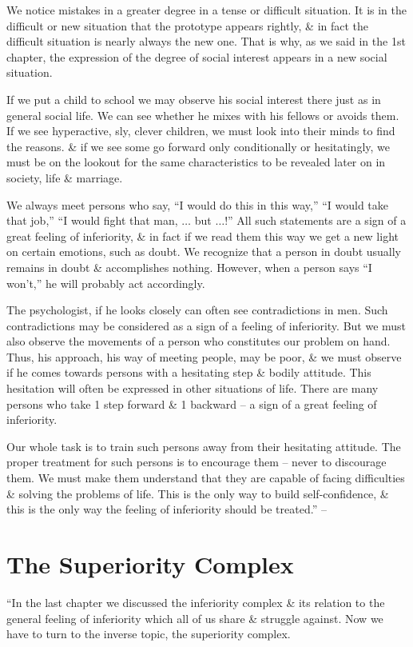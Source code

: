 \documentclass{article}
\begin{document}
We notice mistakes in a greater degree in a tense or difficult situation. It is in the difficult or new situation that the prototype appears rightly, \& in fact the difficult situation is nearly always the new one. That is why, as we said in the 1st chapter, the expression of the degree of social interest appears in a new social situation.

If we put a child to school we may observe his social interest there just as in general social life. We can see whether he mixes with his fellows or avoids them. If we see hyperactive, sly, clever children, we must look into their minds to find the reasons. \& if we see some go forward only conditionally or hesitatingly, we must be on the lookout for the same characteristics to be revealed later on in society, life \& marriage.

We always meet persons who say, ``I would do this in this way,'' ``I would take that job,'' ``I would fight that man, $\ldots$ but $\ldots$!'' All such statements are a sign of a great feeling of inferiority, \& in fact if we read them this way we get a new light on certain emotions, such as doubt. We recognize that a person in doubt usually remains in doubt \& accomplishes nothing. However, when a person says ``I won't,'' he will probably act accordingly.

The psychologist, if he looks closely can often see contradictions in men. Such contradictions may be considered as a sign of a feeling of inferiority. But we must also observe the movements of a person who constitutes our problem on hand. Thus, his approach, his way of meeting people, may be poor, \& we must observe if he comes towards persons with a hesitating step \& bodily attitude. This hesitation will often be expressed in other situations of life. There are many persons who take 1 step forward \& 1 backward -- a sign of a great feeling of inferiority.

Our whole task is to train such persons away from their hesitating attitude. The proper treatment for such persons is to encourage them -- never to discourage them. We must make them understand that they are capable of facing difficulties \& solving the problems of life. This is the only way to build self-confidence, \& this is the only way the feeling of inferiority should be treated.'' -- \cite[pp. 56--77]{Adler_science_living}


\section{The Superiority Complex}
``In the last chapter we discussed the inferiority complex \& its relation to the general feeling of inferiority which all of us share \& struggle against. Now we have to turn to the inverse topic, the superiority complex.
\end{document}
